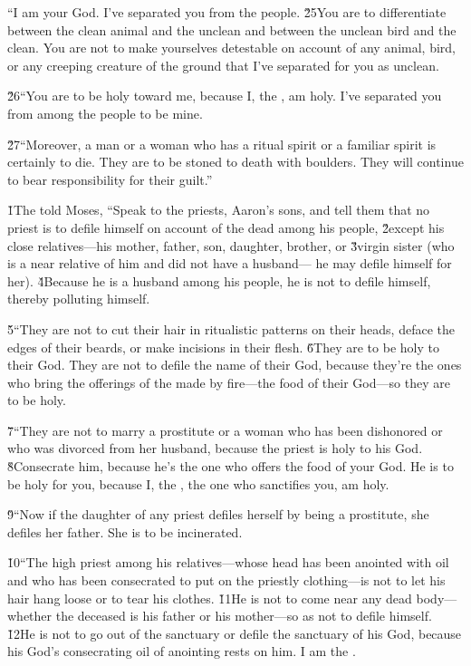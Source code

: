 ``I am your God. I've separated you from the people. \v{25}You are to differentiate between the clean animal and the unclean and between the unclean bird and the clean. You are not to make yourselves detestable on account of any animal, bird, or any creeping creature of the ground that I've separated for you as unclean.

\v{26}``You are to be holy toward me, because I, the , am holy. I've separated you from among the people to be mine.

\v{27}``Moreover, a man or a woman who has a ritual spirit or a familiar spirit is certainly to die. They are to be stoned to death with boulders. They will continue to bear responsibility for their guilt.''

\v{1}The  told Moses, ``Speak to the priests, Aaron's sons, and tell them that no priest is to defile himself on account of the dead among his people, \v{2}except his close relatives---his mother, father, son, daughter, brother, or \v{3}virgin sister (who is a near relative of him and did not have a husband--- he may defile himself for her). \v{4}Because he is a husband among his people, he is not to defile himself, thereby polluting himself.

\v{5}``They are not to cut their hair in ritualistic patterns on their heads, deface the edges of their beards, or make incisions in their flesh. \v{6}They are to be holy to their God. They are not to defile the name of their God, because they're the ones who bring the offerings of the  made by fire---the food of their God---so they are to be holy.

\v{7}``They are not to marry a prostitute or a woman who has been dishonored or who was divorced from her husband, because the priest is holy to his God. \v{8}Consecrate him, because he's the one who offers the food of your God. He is to be holy for you, because I, the , the one who sanctifies you, am holy.

\v{9}``Now if the daughter of any priest defiles herself by being a prostitute, she defiles her father. She is to be incinerated.

\v{10}``The high priest among his relatives---whose head has been anointed with oil and who has been consecrated to put on the priestly clothing---is not to let his hair hang loose or to tear his clothes. \v{11}He is not to come near any dead body---whether the deceased is his father or his mother---so as not to defile himself. \v{12}He is not to go out of the sanctuary or defile the sanctuary of his God, because his God's consecrating oil of anointing rests on him. I am the .

